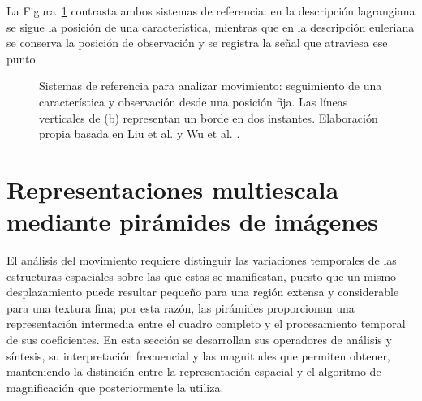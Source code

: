 La Figura~\ref{fig:referencias_movimiento} contrasta ambos sistemas de referencia: en la descripción lagrangiana se sigue la posición de una característica, mientras que en la descripción euleriana se conserva la posición de observación y se registra la señal que atraviesa ese punto.

\begin{figure}[htbp]
\centering
{}
\caption[Sistemas de referencia para analizar movimiento]{Sistemas de referencia para analizar movimiento: seguimiento de una característica y observación desde una posición fija. Las líneas verticales de (b) representan un borde en dos instantes. Elaboración propia basada en Liu et al. y Wu et al. \cite{liu2005motion,wu2012eulerian}.}
\label{fig:referencias_movimiento}
\end{figure}

\section{Representaciones multiescala mediante pirámides de imágenes}
\label{subsec:representaciones_multiescala}

El análisis del movimiento requiere distinguir las variaciones temporales de las estructuras espaciales sobre las que estas se manifiestan, puesto que un mismo desplazamiento puede resultar pequeño para una región extensa y considerable para una textura fina; por esta razón, las pirámides proporcionan una representación intermedia entre el cuadro completo y el procesamiento temporal de sus coeficientes. En esta sección se desarrollan sus operadores de análisis y síntesis, su interpretación frecuencial y las magnitudes que permiten obtener, manteniendo la distinción entre la representación espacial y el algoritmo de magnificación que posteriormente la utiliza.

